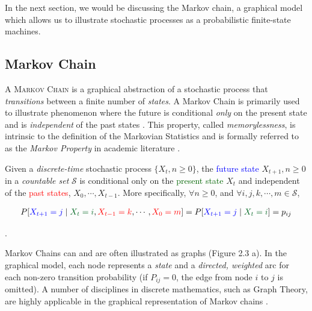 In the next section, we would be discussing the Markov chain, a graphical model which allows us to illustrate stochastic processes as a probabilistic finite-state machines.

\subsection{Markov Chain}
\label{markov}

A \textsc{Markov Chain} is a graphical abstraction of a stochastic process that \emph{transitions} between a finite number of \emph{states}\cite{duivesteijn, venkatg}. A Markov Chain is primarily used to illustrate phenomenon where the future is conditional \emph{only} on the present state and is \emph{independent} of the past states \cite{indiana}. This property, called \emph{memorylessness}, is intrinsic to the definition of the Markovian Statistics and is formally referred to as the \emph{Markov Property} in academic literature \cite{hmms}.\\

\begin{frm-thm}
\textup{Given a \emph{discrete-time} stochastic process $\{X_{t}, n \geq 0\}$, the \textcolor{blue}{future state} $X_{t+1}, n \geq 0$ in a \emph{countable set} $\mathcal{S}$ is conditional only on the \textcolor{darkgreen}{present state} $X_{t}$ and independent of the \textcolor{red}{past states}, $X_{0}, \cdots, X_{t-1}$\footnotemark. More specifically, $\forall n \geq 0$, and $\forall i, j, k, \cdots, m \in \mathcal{S}$,}

\begin{gather*}
P[\textcolor{blue}{X_{t+1} = j} \mid \textcolor{darkgreen}{X_{t} = i}, \textcolor{red}{X_{t-1} = k}, \cdots, \textcolor{red}{X_{0} = m}] = P[\textcolor{blue}{X_{t+1} = j} \mid \textcolor{darkgreen}{X_{t} = i}] = p_{ij}
\end{gather*}

\end{frm-thm}

.\\
\vspace{-15mm}

Markov Chains can and are often illustrated as graphs (Figure 2.3 a). In the graphical model, each node represents a \textit{state} and a \textit{directed, weighted} arc for each non-zero transition probability (if $P_{ij}  =0$, the edge from node $i$ to $j$ is omitted). A number of disciplines in discrete mathematics, such as Graph Theory, are highly applicable in the graphical representation of Markov chains \cite{gallager}. \\

